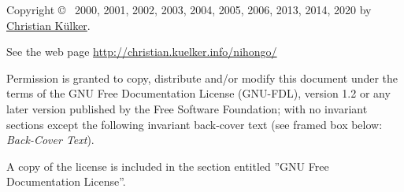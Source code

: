 \footnotesize

Copyright \copyright~ 2000, 2001, 2002, 2003, 2004, 2005, 2006, 2013, 2014,
2020 by
\href{mailto:christian.kuelker@cipworx.org}{Christian K\"ulker}.

\medskip

See the web page
\href{http://christian.kuelker.info/nihongo/}{http://christian.kuelker.info/nihongo/}


Permission is granted to copy, distribute and/or modify this document under the
terms of the GNU Free Documentation License (GNU-FDL), version 1.2 or any later
version published by the Free Software Foundation; with no invariant sections
except the following invariant back-cover text (see framed box below:
\textit{Back-Cover Text}).

A copy of the license is included in the section entitled ”GNU Free
Documentation License”.

\normalsize
